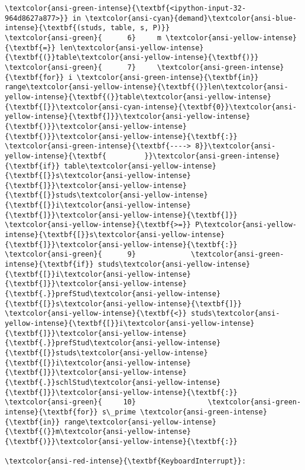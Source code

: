 \documentclass[11pt]{article}
\begin{document}
\begin{Verbatim}[commandchars=\\\{\}, frame=single, framerule=2mm, rulecolor=\color{outerrorbackground}]
\textcolor{ansi-green-intense}{\textbf{<ipython-input-32-964d8627a877>}} in \textcolor{ansi-cyan}{demand}\textcolor{ansi-blue-intense}{\textbf{(studs, table, s, P)}}
\textcolor{ansi-green}{      6}     m \textcolor{ansi-yellow-intense}{\textbf{=}} len\textcolor{ansi-yellow-intense}{\textbf{(}}table\textcolor{ansi-yellow-intense}{\textbf{)}}
\textcolor{ansi-green}{      7}     \textcolor{ansi-green-intense}{\textbf{for}} i \textcolor{ansi-green-intense}{\textbf{in}} range\textcolor{ansi-yellow-intense}{\textbf{(}}len\textcolor{ansi-yellow-intense}{\textbf{(}}table\textcolor{ansi-yellow-intense}{\textbf{[}}\textcolor{ansi-cyan-intense}{\textbf{0}}\textcolor{ansi-yellow-intense}{\textbf{]}}\textcolor{ansi-yellow-intense}{\textbf{)}}\textcolor{ansi-yellow-intense}{\textbf{)}}\textcolor{ansi-yellow-intense}{\textbf{:}}
\textcolor{ansi-green-intense}{\textbf{----> 8}}\textcolor{ansi-yellow-intense}{\textbf{         }}\textcolor{ansi-green-intense}{\textbf{if}} table\textcolor{ansi-yellow-intense}{\textbf{[}}s\textcolor{ansi-yellow-intense}{\textbf{]}}\textcolor{ansi-yellow-intense}{\textbf{[}}studs\textcolor{ansi-yellow-intense}{\textbf{[}}i\textcolor{ansi-yellow-intense}{\textbf{]}}\textcolor{ansi-yellow-intense}{\textbf{]}} \textcolor{ansi-yellow-intense}{\textbf{>=}} P\textcolor{ansi-yellow-intense}{\textbf{[}}s\textcolor{ansi-yellow-intense}{\textbf{]}}\textcolor{ansi-yellow-intense}{\textbf{:}}
\textcolor{ansi-green}{      9}             \textcolor{ansi-green-intense}{\textbf{if}} studs\textcolor{ansi-yellow-intense}{\textbf{[}}i\textcolor{ansi-yellow-intense}{\textbf{]}}\textcolor{ansi-yellow-intense}{\textbf{.}}prefStud\textcolor{ansi-yellow-intense}{\textbf{[}}s\textcolor{ansi-yellow-intense}{\textbf{]}} \textcolor{ansi-yellow-intense}{\textbf{<}} studs\textcolor{ansi-yellow-intense}{\textbf{[}}i\textcolor{ansi-yellow-intense}{\textbf{]}}\textcolor{ansi-yellow-intense}{\textbf{.}}prefStud\textcolor{ansi-yellow-intense}{\textbf{[}}studs\textcolor{ansi-yellow-intense}{\textbf{[}}i\textcolor{ansi-yellow-intense}{\textbf{]}}\textcolor{ansi-yellow-intense}{\textbf{.}}schlStud\textcolor{ansi-yellow-intense}{\textbf{]}}\textcolor{ansi-yellow-intense}{\textbf{:}}
\textcolor{ansi-green}{     10}                 \textcolor{ansi-green-intense}{\textbf{for}} s\_prime \textcolor{ansi-green-intense}{\textbf{in}} range\textcolor{ansi-yellow-intense}{\textbf{(}}m\textcolor{ansi-yellow-intense}{\textbf{)}}\textcolor{ansi-yellow-intense}{\textbf{:}}

\textcolor{ansi-red-intense}{\textbf{KeyboardInterrupt}}: 
    \end{Verbatim}
\end{document}

